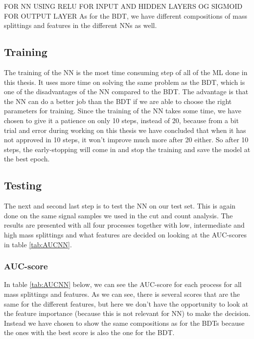 FOR NN USING RELU FOR INPUT AND HIDDEN LAYERS OG SIGMOID FOR OUTPUT LAYER
As for the BDT, we have different compositions of mass splittings and features in the different NNs as well. 

\subsection{Training}
The training of the NN is the most time consuming step of all of the ML done in this thesis. It uses more time on solving the same problem as the BDT, which is one of the disadvantages of the NN compared to the BDT. The advantage is that the NN can do a better job than the BDT if we are able to choose the right parameters for training. Since the training of the NN takes some time, we have chosen to give it a patience on only 10 steps, instead of 20, because from a bit trial and error during working on this thesis we have concluded that when it has not approved in 10 steps, it won't improve much more after 20 either. So after 10 steps, the early-stopping will come in and stop the training and save the model at the best epoch. 

\subsection{Testing}
The next and second last step is to test the NN on our test set. This is again done on the same signal samples we used in the cut and count analysis. The results are presented with all four processes together with low, intermediate and high mass splittings and what features are decided on looking at the AUC-scores in table \ref{tab:AUCNN}.


\subsubsection{AUC-score}
In table \ref{tab:AUCNN} below, we can see the AUC-score for each process for all mass splittings and features. As we can see, there is several scores that are the same for the different features, but here we don't have the opportunity to look at the feature importance (because this is not relevant for NN) to make the decision. Instead we have chosen to show the same compositions as for the BDTs because the ones with the best score is also the one for the BDT. 

